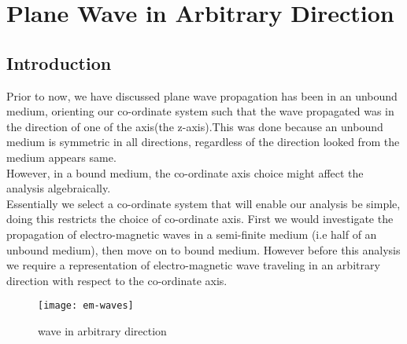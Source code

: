 \chapter{Plane Wave in Arbitrary Direction}
\section{\textbf{Introduction}}
Prior to now, we have discussed  plane wave propagation has been in an unbound medium, orienting our co-ordinate system such that the wave propagated was in the direction of one of the axis(the z-axis).This was done because an unbound medium is symmetric in all directions, regardless of the direction looked from the medium appears same.\\
However, in a bound medium, the co-ordinate axis choice might affect the analysis algebraically.\\
Essentially we select a co-ordinate system that will enable our analysis be simple, doing this restricts the choice of co-ordinate axis. First we would investigate the propagation of electro-magnetic waves in a semi-finite medium (i.e half of an unbound medium), then move on to bound medium. However before this analysis we require a representation of electro-magnetic wave traveling in an arbitrary direction with respect to the co-ordinate axis.
\begin{figure}[h]
\centering
\texttt{[image: em-waves]}
\caption{wave in arbitrary direction}
\end{figure}
